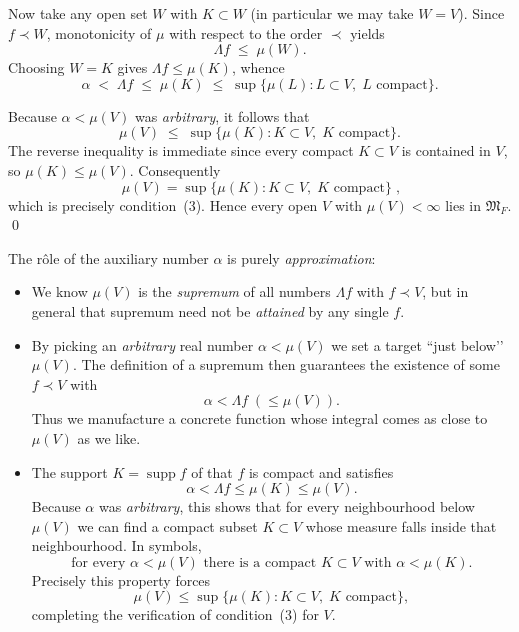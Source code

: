 \documentclass[12pt]{article}
\theoremstyle{definition} %
\theoremstyle{plain} %
\begin{document}
\medskip
Now take any open set $W$ with $K\subset W$ (in particular we may take
$W=V$).  Since $f\prec W$, monotonicity of $\mu$ with respect to the
order $\prec$ yields
\[
      \Lambda f\;\le\;\mu(W).
\]
Choosing $W=K$ gives $\Lambda f\le\mu(K)$, whence
\[
      \alpha\;<\;\Lambda f\;\le\;\mu(K)\;\le\;
      \sup\{\mu(L):L\subset V,\;L\text{ compact}\}.
\]

\medskip
Because $\alpha<\mu(V)$ was \emph{arbitrary}, it follows that
\[
      \mu(V)\;\le\;\sup\{\mu(K):K\subset V,\;K\text{ compact}\}.
\]
The reverse inequality is immediate since every compact
$K\subset V$ is contained in $V$, so $\mu(K)\le\mu(V)$.
Consequently
\[
      \boxed{\;
         \mu(V)=\sup\{\mu(K):K\subset V,\;K\text{ compact}\}
      \;},
\]
which is precisely condition~(3).  Hence every open
$V$ with $\mu(V)<\infty$ lies in $\mathfrak{M}_F$.
\qed
\pagebreak

The rôle of the auxiliary number $\alpha$ is purely \emph{approximation}:

\begin{itemize}
  \item We know \(\mu(V)\) is the \emph{supremum} of all numbers
        \(\Lambda f\) with \(f\prec V\), but in general that supremum
        need not be \emph{attained} by any single \(f\).
  \item By picking an \emph{arbitrary} real number
        \(\alpha<\mu(V)\) we set a target “just below’’ \(\mu(V)\).
        The definition of a supremum then guarantees
        the existence of some \(f\prec V\) with
        \[
             \alpha<\Lambda f\;(\le \mu(V)).
        \]
        Thus we manufacture a concrete function whose integral comes as
        close to \(\mu(V)\) as we like.
  \item The support \(K=\operatorname{supp}f\) of that \(f\) is compact
        and satisfies
        \[
             \alpha<\Lambda f\le\mu(K)\le\mu(V).
        \]
        Because \(\alpha\) was \emph{arbitrary}, this shows that for
        every neighbourhood below \(\mu(V)\) we can find a compact
        subset \(K\subset V\) whose measure falls inside that
        neighbourhood.  In symbols,
        \[
             \text{for every } \alpha<\mu(V)\text{ there is a compact }
             K\subset V\text{ with }\alpha<\mu(K).
        \]
        Precisely this property forces
        \[
             \mu(V)\le\sup\{\mu(K):K\subset V,\;K\text{ compact}\},
        \]
        completing the verification of condition~(3) for \(V\).
\end{itemize}
\end{document}
